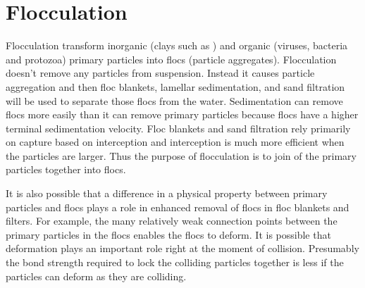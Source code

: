 \documentclass[letterpaper,10pt,english]{sphinxmanual}
\begin{document}
\section{Flocculation}
\label{\detokenize{Flocculation/Floc_Intro:flocculation}}
Flocculation transform inorganic (clays such as ) and organic (viruses, bacteria and protozoa) primary particles into flocs (particle aggregates). Flocculation doesn’t remove any particles from suspension. Instead it causes particle aggregation and then floc blankets, lamellar sedimentation, and sand filtration will be used to separate those flocs from the water. Sedimentation can remove flocs more easily than it can remove primary particles because flocs have a higher terminal sedimentation velocity. Floc blankets and sand filtration rely primarily on capture based on interception and interception is much more efficient when the particles are larger. Thus the purpose of flocculation is to join  of the primary particles together into flocs.

It is also possible that a difference in a physical property between primary particles and flocs plays a role in enhanced removal of flocs in floc blankets and filters. For example, the many relatively weak connection points between the primary particles in the flocs enables the flocs to deform. It is possible that deformation plays an important role right at the moment of collision. Presumably the bond strength required to lock the colliding particles together is less if the particles can deform as they are colliding.
\end{document}
